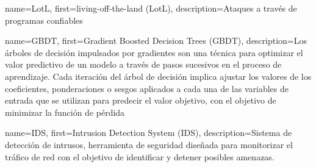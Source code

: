   {name={LotL}, first={living-off-the-land (LotL)},   description={Ataques a través de programas confiables}}

  {name={GBDT}, first={Gradient Boosted Decision Trees (GBDT)},   description={Los árboles de decisión impulsados por gradientes son una técnica para optimizar el valor predictivo de un modelo a través de pasos sucesivos en el proceso de aprendizaje. Cada iteración del árbol de decisión implica ajustar los valores de los coeficientes, ponderaciones o sesgos aplicados a cada una de las variables de entrada que se utilizan para predecir el valor objetivo, con el objetivo de minimizar la función de pérdida}}

    {name={IDS}, first={Intrusion Detection System (IDS)},          description={Sistema de detección de intrusos, herramienta de seguridad diseñada para monitorizar el tráfico de red con el objetivo de identificar y detener posibles amenazas.}}




